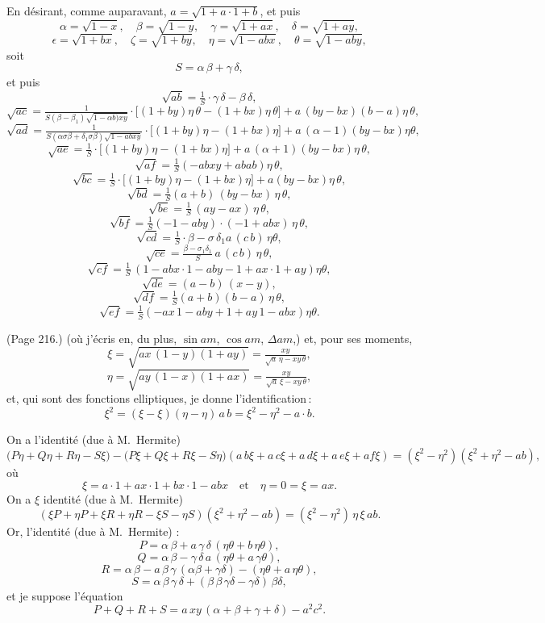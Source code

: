\documentclass[11pt,a4paper]{article}
\theoremstyle{plain}
\theoremstyle{definition}
\begin{document}
En d\'esirant, comme auparavant, $a = \sqrt{1 + a\cdot 1 + b}$, et puis
\[
\alpha = \sqrt{1 - x}, \quad \beta = \sqrt{1 - y}, \quad \gamma = \sqrt{1 + a x}, \quad \delta = \sqrt{1 + a y},
\]
\[
\epsilon = \sqrt{1 + b x}, \quad \zeta = \sqrt{1 + b y}, \quad \eta = \sqrt{1 - abx}, \quad \theta = \sqrt{1 - aby},
\]
soit
\[
S = \alpha\,\beta + \gamma\,\delta,
\]
et puis
\[
\sqrt{a b} = \tfrac{1}{S} \cdot \gamma\,\delta - \beta\,\delta,
\]
\[
\sqrt{a c} = \tfrac{1}{S(\beta - \beta_1)\sqrt{1 - \alpha b)x y}} \cdot \big[(1 + by)\eta\,\theta - (1 + b x)\eta\,\theta\big] + a\,(b y - b x)(b - a)\eta\,\theta,
\]
\[
\sqrt{a d} = \tfrac{1}{S(\alpha\sigma\beta + \delta_1\sigma\beta)\sqrt{1 - abx y}} \cdot \big[(1 + by)\eta - (1 + b x)\eta\big] + a\,(\alpha - 1)(b y - b x)\eta\theta,
\]
\[
\sqrt{a e} = \tfrac{1}{S} \cdot \big[(1 + by)\eta - (1 + b x)\eta\big] + a\,(\alpha + 1)(b y - b x)\eta\,\theta,
\]
\[
\sqrt{a f} = \tfrac{1}{S} (- a b x y + a b a b)\eta\,\theta,
\]
\[
\sqrt{b c} = \tfrac{1}{S} \cdot \big[(1 + by)\eta - (1 + b x)\eta\big] + a (b y - b x) \eta\,\theta,
\]
\[
\sqrt{b d} = \tfrac{1}{S} (a + b)\,(b y - b x)\,\eta\,\theta,
\]
\[
\sqrt{b e} = \tfrac{1}{S}\,(a y - a x)\,\eta\,\theta,
\]
\[
\sqrt{b f} = \tfrac{1}{S} (- 1 - a b y) \cdot (- 1 + a b x)\,\eta\,\theta,
\]
\[
\sqrt{c d} = \tfrac{1}{S} \cdot \beta - \sigma\,\delta_1 a\,(c\,b)\,\eta\theta,
\]
\[
\sqrt{c e} = \tfrac{\beta - \sigma_1\delta_1}{S}\,a\,(c\,b)\,\eta\,\theta,
\]
\[
\sqrt{c f} = \tfrac{1}{S}\,(1 - a b x\cdot 1 - a b y - 1 + a x\cdot 1 + a y)\eta\theta,
\]
\[
\sqrt{d e} = (a - b)\,(x - y),
\]
\[
\sqrt{d f} = \tfrac{1}{S} (a + b)(b - a)\,\eta\,\theta,
\]
\[
\sqrt{e f} = \tfrac{1}{S}(- a x\,1 - a b y + 1 + a y\,1 - a b x)\eta\theta.
\]

\medskip

\noindent (Page 216.) (o\`u j'\'ecris en, du plus, $\sin am$, $\cos am$, $\Delta am$,) et, pour ses moments,
\[
\xi = \sqrt{ax\,(1 - y)(1 + ay)} = \tfrac{x y}{\sqrt{a}\,\eta - x y\,\theta},
\]
\[
\eta = \sqrt{a y\,(1 - x)(1 + ax)} = \tfrac{x y}{\sqrt{a}\,\xi - x y\,\theta},
\]
et, qui sont des fonctions elliptiques, je donne l'identification\,:
\[
\xi^2 = (\xi - \xi)(\eta - \eta)\,a\,b = \xi^2 - \eta^2 - a \cdot b.
\]

On a l'identit\'e (due \`a M.~Hermite)
\[
\big(P\eta + Q\eta + R \eta - S\xi\big) - \big(P\xi + Q\xi + R\xi - S\eta\big) (a\,b\xi + a\,c\xi + a\,d\xi + a\,e\xi + a f\xi) = (\xi^2 - \eta^2)(\xi^2 + \eta^2 - a b),
\]
o\`u
\[
\xi = a \cdot 1 + a x \cdot 1 + b x \cdot 1 - a b x \quad \text{et} \quad \eta = 0 = \xi = a x.
\]
On a $\xi$ identit\'e (due \`a M.~Hermite)
\[
(\xi P + \eta P + \xi R + \eta R - \xi S - \eta S)(\xi^2 + \eta^2 - a b) = (\xi^2 - \eta^2)\,\eta\,\xi\,a b.
\]
Or, l'identit\'e (due \`a M.~Hermite) :
\[
P = \alpha\,\beta + a\,\gamma\,\delta\,(\eta\theta + b\,\eta\theta),
\]
\[
Q = \alpha\,\beta - \gamma\,\delta\,a\,(\eta\theta + a\,\gamma\theta),
\]
\[
R = \alpha\,\beta - a\,\beta\,\gamma\,(\alpha\beta + \gamma\delta) - (\eta\theta + a\,\eta\theta),
\]
\[
S = \alpha\,\beta\,\gamma\,\delta + (\beta\,\beta\,\gamma\delta - \gamma\delta)\,\beta\delta,
\]
et je suppose l'\'equation
\[
P + Q + R + S = a\,xy\,(\alpha + \beta + \gamma + \delta) - a^2 c^2.
\]
\end{document}
